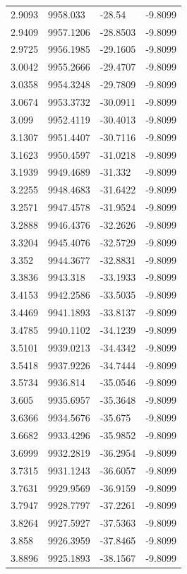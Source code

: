\begin{table}[H]
\begin{tabular}{llll}
2.9093 & 9958.033 & -28.54 & -9.8099 \\
2.9409 & 9957.1206 & -28.8503 & -9.8099 \\
2.9725 & 9956.1985 & -29.1605 & -9.8099 \\
3.0042 & 9955.2666 & -29.4707 & -9.8099 \\
3.0358 & 9954.3248 & -29.7809 & -9.8099 \\
3.0674 & 9953.3732 & -30.0911 & -9.8099 \\
3.099 & 9952.4119 & -30.4013 & -9.8099 \\
3.1307 & 9951.4407 & -30.7116 & -9.8099 \\
3.1623 & 9950.4597 & -31.0218 & -9.8099 \\
3.1939 & 9949.4689 & -31.332 & -9.8099 \\
3.2255 & 9948.4683 & -31.6422 & -9.8099 \\
3.2571 & 9947.4578 & -31.9524 & -9.8099 \\
3.2888 & 9946.4376 & -32.2626 & -9.8099 \\
3.3204 & 9945.4076 & -32.5729 & -9.8099 \\
3.352 & 9944.3677 & -32.8831 & -9.8099 \\
3.3836 & 9943.318 & -33.1933 & -9.8099 \\
3.4153 & 9942.2586 & -33.5035 & -9.8099 \\
3.4469 & 9941.1893 & -33.8137 & -9.8099 \\
3.4785 & 9940.1102 & -34.1239 & -9.8099 \\
3.5101 & 9939.0213 & -34.4342 & -9.8099 \\
3.5418 & 9937.9226 & -34.7444 & -9.8099 \\
3.5734 & 9936.814 & -35.0546 & -9.8099 \\
3.605 & 9935.6957 & -35.3648 & -9.8099 \\
3.6366 & 9934.5676 & -35.675 & -9.8099 \\
3.6682 & 9933.4296 & -35.9852 & -9.8099 \\
3.6999 & 9932.2819 & -36.2954 & -9.8099 \\
3.7315 & 9931.1243 & -36.6057 & -9.8099 \\
3.7631 & 9929.9569 & -36.9159 & -9.8099 \\
3.7947 & 9928.7797 & -37.2261 & -9.8099 \\
3.8264 & 9927.5927 & -37.5363 & -9.8099 \\
3.858 & 9926.3959 & -37.8465 & -9.8099 \\
3.8896 & 9925.1893 & -38.1567 & -9.8099 \\

\end{tabular}
\end{table}
